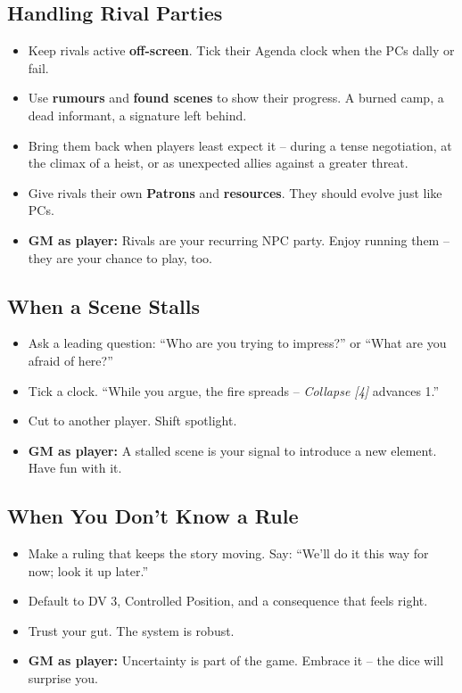 \subsection*{Handling Rival Parties}
\begin{itemize}
  \item Keep rivals active \textbf{off-screen}. Tick their Agenda clock when the PCs dally or fail.
  \item Use \textbf{rumours} and \textbf{found scenes} to show their progress. A burned camp, a dead informant, a signature left behind.
  \item Bring them back when players least expect it – during a tense negotiation, at the climax of a heist, or as unexpected allies against a greater threat.
  \item Give rivals their own \textbf{Patrons} and \textbf{resources}. They should evolve just like PCs.
  \item \textbf{GM as player:} Rivals are your recurring NPC party. Enjoy running them – they are your chance to play, too.
\end{itemize}

\subsection*{When a Scene Stalls}
\begin{itemize}
  \item Ask a leading question: “Who are you trying to impress?” or “What are you afraid of here?”
  \item Tick a clock. “While you argue, the fire spreads – \emph{Collapse [4]} advances 1.”
  \item Cut to another player. Shift spotlight.
  \item \textbf{GM as player:} A stalled scene is your signal to introduce a new element. Have fun with it.
\end{itemize}

\subsection*{When You Don’t Know a Rule}
\begin{itemize}
  \item Make a ruling that keeps the story moving. Say: “We’ll do it this way for now; look it up later.”
  \item Default to DV 3, Controlled Position, and a consequence that feels right.
  \item Trust your gut. The system is robust.
  \item \textbf{GM as player:} Uncertainty is part of the game. Embrace it – the dice will surprise you.
\end{itemize}

